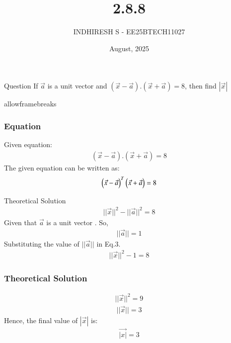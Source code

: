 \documentclass{beamer}
\title %
{2.8.8}
\date{August, 2025}
\author %
{INDHIRESH S - EE25BTECH11027}
\begin{document}
\frame{\titlepage}
\begin{frame}{Question}
If $\vec{a}$ is a unit vector and $(\vec{x} -\vec{a}).(\vec{x}+\vec{a}) = 8$, then find $|\vec{x}|$\\
\end{frame}
\begin{frame}{allowframebreaks}
\frametitle{Equation}

    \centering
    
    \label{tab:parameters}
Given equation:
\begin{align}
     (\vec{x} -\vec{a}).(\vec{x}+\vec{a}) = 8
\end{align}
The given equation can be written as:
\begin{align}
   \begin{pmatrix}\Vec{x}-\Vec{a}\end{pmatrix}^T\begin{pmatrix}\Vec{x}+\Vec{a}\end{pmatrix}=8
\end{align}
   
\end{frame}


\begin{frame}{Theoretical Solution}
\begin{align}
    ||\Vec{x}||^2-||\Vec{a}||^2=8
\end{align}
Given that $\Vec{a}$ is a unit vector . So,
\begin{align}
    ||\Vec{a}||=1
\end{align}
Substituting the value of $||\Vec{a}||$ in Eq.3.
\begin{align}
    ||\Vec{x}||^2-1=8
\end{align}



\end{frame}
\begin{frame}
\frametitle{Theoretical Solution}
\begin{align}
    ||\Vec{x}||^2=9
\end{align}
\begin{align}
     ||\Vec{x}||=3
\end{align}
Hence, the final value of $|\Vec{x}|$ is:
\begin{align}
    \Vec{|x|}=3
\end{align}

\end{frame}
\end{document}
